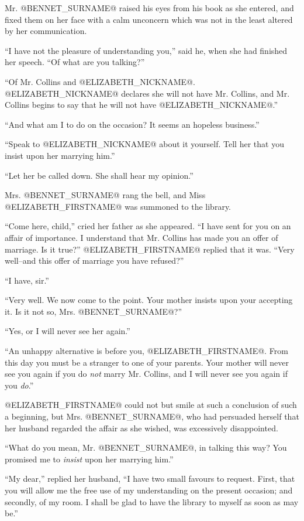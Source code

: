 Mr. @BENNET_SURNAME@ raised his eyes from his book as she entered, and fixed them
on her face with a calm unconcern which was not in the least altered by
her communication.

``I have not the pleasure of understanding you,'' said he, when she had
finished her speech. ``Of what are you talking?''

``Of Mr. Collins and @ELIZABETH_NICKNAME@. @ELIZABETH_NICKNAME@ declares she will not have Mr. Collins,
and Mr. Collins begins to say that he will not have @ELIZABETH_NICKNAME@.''

``And what am I to do on the occasion? It seems an hopeless business.''

``Speak to @ELIZABETH_NICKNAME@ about it yourself. Tell her that you insist upon her
marrying him.''

``Let her be called down. She shall hear my opinion.''

Mrs. @BENNET_SURNAME@ rang the bell, and Miss @ELIZABETH_FIRSTNAME@ was summoned to the
library.

``Come here, child,'' cried her father as she appeared. ``I have sent for
you on an affair of importance. I understand that Mr. Collins has made
you an offer of marriage. Is it true?'' @ELIZABETH_FIRSTNAME@ replied that it was.
``Very well--and this offer of marriage you have refused?''

``I have, sir.''

``Very well. We now come to the point. Your mother insists upon your
accepting it. Is it not so, Mrs. @BENNET_SURNAME@?''

``Yes, or I will never see her again.''

``An unhappy alternative is before you, @ELIZABETH_FIRSTNAME@. From this day you must
be a stranger to one of your parents. Your mother will never see you
again if you do \textit{not} marry Mr. Collins, and I will never see you again
if you \textit{do}.''

@ELIZABETH_FIRSTNAME@ could not but smile at such a conclusion of such a beginning,
but Mrs. @BENNET_SURNAME@, who had persuaded herself that her husband regarded the
affair as she wished, was excessively disappointed.

``What do you mean, Mr. @BENNET_SURNAME@, in talking this way? You promised me to
\textit{insist} upon her marrying him.''

``My dear,'' replied her husband, ``I have two small favours to request.
First, that you will allow me the free use of my understanding on the
present occasion; and secondly, of my room. I shall be glad to have the
library to myself as soon as may be.''

